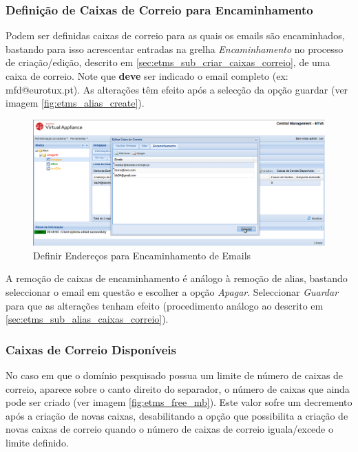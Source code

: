\subsubsection{Definição de Caixas de Correio para Encaminhamento}
\label{sec:etms_sub_encaminhamento_caixas_correio}
Podem ser definidas caixas de correio para as quais os emails são encaminhados, bastando para isso acrescentar entradas na grelha \textit{Encaminhamento} no processo de criação/edição, descrito em \ref{sec:etms_sub_criar_caixas_correio}, de uma caixa de correio. Note que \textbf{deve} ser indicado o email completo (ex: mfd@eurotux.pt). As alterações têm efeito após a selecção da opção guardar (ver imagem \ref{fig:etms_alias_create}).

\begin{figure}[H]
    \begin{center}
    \includegraphics[scale=0.35]{screenshots/etms/etms_forwarding_mb_del.png}
    \caption{Definir Endereços para Encaminhamento de Emails}
    \label{fig:etms_forwarding_mb_del}
    \end{center}
\end{figure}

A remoção de caixas de encaminhamento é análogo à remoção de alias, bastando seleccionar o email em questão e escolher a opção \textit{Apagar}. Seleccionar \textit{Guardar} para que as alterações tenham efeito (procedimento análogo ao descrito em \ref{sec:etms_sub_alias_caixas_correio}).

\subsubsection{Caixas de Correio Disponíveis}
\label{sec:etms_sub_disponiveis_caixas_correio}
No caso em que o domínio pesquisado possua um limite de número de caixas de correio, aparece sobre o canto direito do separador, o número de caixas que ainda pode ser criado (ver imagem \ref{fig:etms_free_mb}). Este valor sofre um decremento após a criação de novas caixas, desabilitando a opção que possibilita a criação de novas caixas de correio quando o número de caixas de correio iguala/excede o limite definido.

